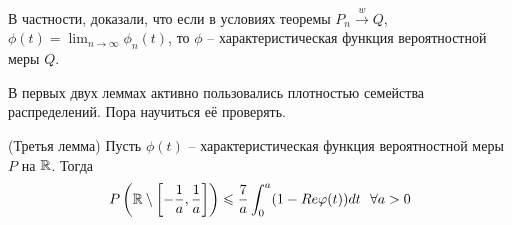 \begin{note}
    В частности, доказали, что если в условиях теоремы $P_n \xrightarrow{w} Q$, $\phi(t) = \lim_{n \to \infty} \phi_n(t)$, то $\phi$ -- характеристическая функция вероятностной меры $Q$.
\end{note}

\begin{note}
    В первых двух леммах активно пользовались плотностью семейства распределений. Пора научиться её проверять.
\end{note}

\begin{lemma} (Третья лемма)
    Пусть $\phi(t)$ -- характеристическая функция вероятностной меры $P$ на $\mathbb{R}$. Тогда
    \[
        P \left( \mathbb{R} \setminus \left[ -\frac{1}{a}, \frac{1}{a} \right] \right) \leqslant \frac{7}{a} \int_0^a (1-Re\varphi(t)) dt \ \ \forall a > 0
    \]
\end{lemma}

